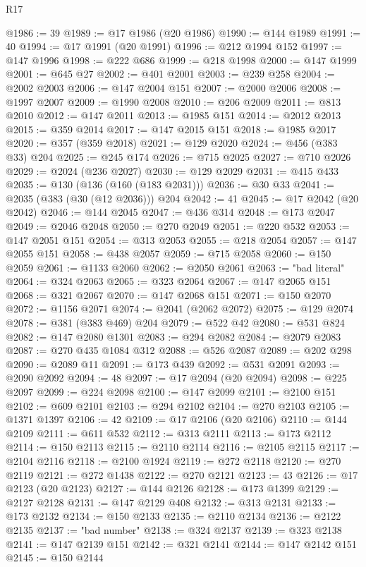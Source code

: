 \begin{lexlean}{R17}
\begin{coremodule}
@1986 := 39
@1989 := @17 @1986 (@20 @1986)
@1990 := @144 @1989
@1991 := 40
@1994 := @17 @1991 (@20 @1991)
@1996 := @212 @1994 @152
@1997 := @147 @1996
@1998 := @222 @686
@1999 := @218 @1998
@2000 := @147 @1999
@2001 := @645 @27
@2002 := @401 @2001
@2003 := @239 @258
@2004 := @2002 @2003
@2006 := @147 @2004 @151
@2007 := @2000 @2006
@2008 := @1997 @2007
@2009 := @1990 @2008
@2010 := @206 @2009
@2011 := @813 @2010
@2012 := @147 @2011
@2013 := @1985 @151
@2014 := @2012 @2013
@2015 := @359 @2014
@2017 := @147 @2015 @151
@2018 := @1985 @2017
@2020 := @357 (@359 @2018)
@2021 := @129 @2020
@2024 := @456 (@383 @33) @204
@2025 := @245 @174
@2026 := @715 @2025
@2027 := @710 @2026
@2029 := @2024 (@236 @2027)
@2030 := @129 @2029
@2031 := @415 @433
@2035 := @130 (@136 (@160 (@183 @2031)))
@2036 := @30 @33
@2041 := @2035 (@383 (@30 (@12 @2036))) @204
@2042 := 41
@2045 := @17 @2042 (@20 @2042)
@2046 := @144 @2045
@2047 := @436 @314
@2048 := @173 @2047
@2049 := @2046 @2048
@2050 := @270 @2049
@2051 := @220 @532
@2053 := @147 @2051 @151
@2054 := @313 @2053
@2055 := @218 @2054
@2057 := @147 @2055 @151
@2058 := @438 @2057
@2059 := @715 @2058
@2060 := @150 @2059
@2061 := @1133 @2060
@2062 := @2050 @2061
@2063 := "bad literal"
@2064 := @324 @2063
@2065 := @323 @2064
@2067 := @147 @2065 @151
@2068 := @321 @2067
@2070 := @147 @2068 @151
@2071 := @150 @2070
@2072 := @1156 @2071
@2074 := @2041 (@2062 @2072)
@2075 := @129 @2074
@2078 := @381 (@383 @469) @204
@2079 := @522 @42
@2080 := @531 @824
@2082 := @147 @2080 @1301
@2083 := @294 @2082
@2084 := @2079 @2083
@2087 := @270 @435 @1084 @312
@2088 := @526 @2087
@2089 := @202 @298
@2090 := @2089 @11
@2091 := @173 @439
@2092 := @531 @2091
@2093 := @2090 @2092
@2094 := 48
@2097 := @17 @2094 (@20 @2094)
@2098 := @225 @2097
@2099 := @224 @2098
@2100 := @147 @2099
@2101 := @2100 @151
@2102 := @609 @2101
@2103 := @294 @2102
@2104 := @270 @2103
@2105 := @1371 @1397
@2106 := 42
@2109 := @17 @2106 (@20 @2106)
@2110 := @144 @2109
@2111 := @611 @532
@2112 := @313 @2111
@2113 := @173 @2112
@2114 := @150 @2113
@2115 := @2110 @2114
@2116 := @2105 @2115
@2117 := @2104 @2116
@2118 := @2100 @1924
@2119 := @272 @2118
@2120 := @270 @2119
@2121 := @272 @1438
@2122 := @270 @2121
@2123 := 43
@2126 := @17 @2123 (@20 @2123)
@2127 := @144 @2126
@2128 := @173 @1399
@2129 := @2127 @2128
@2131 := @147 @2129 @408
@2132 := @313 @2131
@2133 := @173 @2132
@2134 := @150 @2133
@2135 := @2110 @2134
@2136 := @2122 @2135
@2137 := "bad number"
@2138 := @324 @2137
@2139 := @323 @2138
@2141 := @147 @2139 @151
@2142 := @321 @2141
@2144 := @147 @2142 @151
@2145 := @150 @2144

\end{coremodule}
\end{lexlean}
